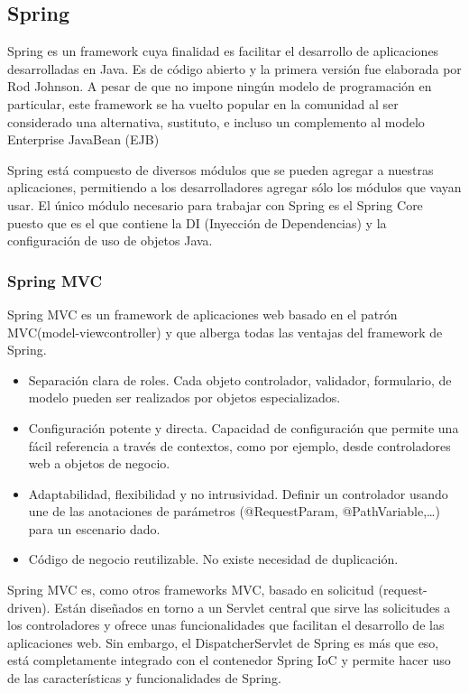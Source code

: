 \subsection{Spring}
Spring es un framework cuya finalidad es facilitar el desarrollo de aplicaciones desarrolladas en Java. Es de código abierto y la primera versión fue elaborada por Rod Johnson. A pesar de que no impone ningún modelo de programación en particular, este framework se ha vuelto popular en la comunidad al ser considerado una alternativa, sustituto, e incluso un complemento al modelo Enterprise JavaBean (EJB)

Spring está compuesto de diversos módulos que se pueden agregar a nuestras aplicaciones, permitiendo a los desarrolladores agregar sólo los módulos que vayan usar. El único módulo necesario para trabajar con Spring es el Spring Core puesto que es el que contiene la DI (Inyección de Dependencias) y la configuración de uso de objetos Java.

\subsubsection*{Spring MVC}
Spring MVC es un framework de aplicaciones web basado en el patrón MVC(model-viewcontroller) y que alberga todas las ventajas del framework de Spring.
	\begin{itemize}
		 \item Separación clara de roles. Cada objeto controlador, validador, formulario, de modelo pueden ser realizados por objetos especializados.
		 \item Configuración potente y directa. Capacidad de configuración que permite una fácil referencia a través de contextos, como por ejemplo, desde controladores web a objetos de negocio.
		 \item Adaptabilidad, flexibilidad y no intrusividad. Definir un controlador usando une de las anotaciones de parámetros (@RequestParam, @PathVariable,…) para un escenario dado.
		 \item Código de negocio reutilizable. No existe necesidad de duplicación.
	\end{itemize}
	
Spring MVC es, como otros frameworks MVC, basado en solicitud (request-driven). Están diseñados en torno a un Servlet central que sirve las solicitudes a los controladores y ofrece unas funcionalidades que facilitan el desarrollo de las aplicaciones web. Sin embargo, el DispatcherServlet de Spring es más que eso, está completamente integrado con el contenedor Spring IoC y permite hacer uso de las características y funcionalidades de Spring.

